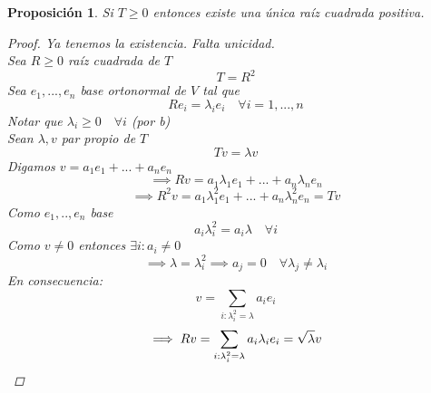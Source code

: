 \documentclass[11pt]{book}
\newtheorem{prop}[thm]{Proposición}
\theoremstyle{definition}
\begin{document}
\begin{prop}
	Si $T\geq 0$ entonces existe una única raíz cuadrada positiva.
	\begin{proof}
		Ya tenemos la existencia. Falta unicidad.\\
		Sea $R\geq 0$ raíz cuadrada de $T$
		\[T=R^2\]
		Sea $e_1,...,e_n$ base ortonormal de $V$ tal que
		\[Re_i=\lambda_ie_i\quad\forall i=1,...,n\]
		Notar que $\lambda_i\geq 0\quad\forall i$ (por b)\\
		Sean $\lambda,v$ par propio de $T$
		\[Tv=\lambda v\]
		Digamos $v=a_1e_1+...+a_ne_n$
		\[\implies Rv=a_1\lambda_1e_1+...+a_n\lambda_ne_n\]
		\[\implies R^2v=a_1\lambda_1^2e_1+...+a_n\lambda_n^2e_n=Tv\]
		Como $e_1,..,e_n$ base
		\[a_i\lambda_i^2=a_i\lambda\quad\forall i\]
		Como $v\neq 0$ entonces $\exists i: a_i\neq 0$
		\[\implies \lambda=\lambda_i^2\implies a_j=0\quad\forall\lambda_j\neq\lambda_i\]
		En consecuencia:
		\[v=\sum_{i:\lambda_i^2=\lambda}a_ie_i\]
		\[\implies Rv=\sum_{i:\lambda_i^2=\lambda}a_i\lambda_ie_i=\sqrt{\lambda}v\qedhere\]
	\end{proof}
\end{prop}
\end{document}
